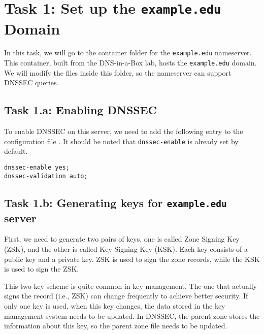 \section{Task 1: Set up the \texttt{example.edu} Domain}


In this task, we will go to the container folder for the 
\texttt{example.edu} nameserver. This container, built 
from the DNS-in-a-Box lab, hosts 
the \texttt{example.edu} domain. 
We will modify the files inside this folder, so the nameserver
can support DNSSEC queries.


\subsection{Task 1.a: Enabling DNSSEC}

To enable DNSSEC on this server, we need to add the following entry to the 
configuration file . 
It should be noted that \texttt{dnssec-enable} is already set by default. 

\begin{lstlisting}
dnssec-enable yes;
dnssec-validation auto;
\end{lstlisting}



\subsection{Task 1.b: Generating keys for \texttt{example.edu} server} 

First, we need to generate two pairs of keys, one is called Zone Signing Key (ZSK), and 
the other is called Key Signing Key (KSK). Each key consists of a public key and a private key.
ZSK is used to sign the zone records, while the KSK is used to sign the ZSK. 

This two-key scheme is quite common in key management. The one that actually signs the record
(i.e., ZSK) can change frequently to achieve better security. If only one key is used,
when this key changes, the data stored in the key management system needs to be updated. 
In DNSSEC, the parent zone stores the information about this key, so the parent zone file
needs to be updated. 

